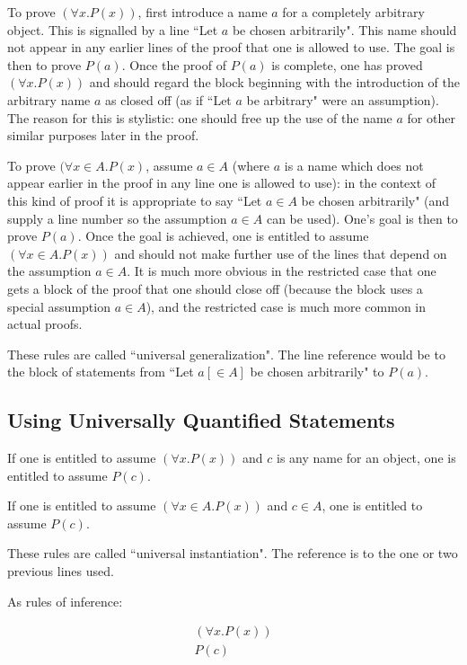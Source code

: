 \documentclass[12pt]{book}
\begin{document}
To prove $(\forall x.P(x))$,  first introduce a name $a$ for a completely arbitrary object.  This is signalled by a line ``Let $a$ be chosen arbitrarily".  This name should not appear
in any earlier lines of the proof that one is allowed to use.  The goal is then to prove $P(a)$. Once the proof of $P(a)$ is complete, one has proved $(\forall x.P(x))$ and should regard the block beginning with the introduction
of the arbitrary name $a$ as closed off (as if ``Let $a$ be arbitrary" were an assumption).  The reason for this is stylistic:  one should free up the use of the name $a$ for other similar purposes later in the proof.

To prove $(\forall x \in A.P(x)$, assume $a \in A$ (where $a$ is a name which does not appear earlier in the proof in any line one is allowed to use):  in the context of this kind of proof it is appropriate to say ``Let $a \in A$ be chosen arbitrarily" (and supply a line number so the assumption $a \in A$ can be used).  One's goal is then to prove $P(a)$.  Once the goal is achieved, one is entitled to assume
$(\forall x \in A.P(x))$ and should not make further use of the lines that depend on the assumption $a \in A$.  It is much more obvious in the restricted case that one gets a block of the proof that one should close off (because the block uses a special assumption $a \in A$), and the restricted case is much more common in actual proofs.

These rules are called ``universal generalization".  The line reference would be to the block of statements
from ``Let $a[\in A]$ be chosen arbitrarily" to $P(a)$.

\subsection{Using Universally Quantified Statements}

If one is entitled to assume $(\forall x.P(x))$ and $c$ is any name for an object, one is entitled to assume $P(c)$.

If one is entitled to assume $(\forall x \in A.P(x))$ and $c \in A$, one is entitled to assume $P(c)$.

These rules are called ``universal instantiation".  The reference is to the one or two previous lines used.

\newpage

As rules of inference:

$$\begin{array}{r} (\forall x.P(x)) \\ \hline P(c) \end{array}$$
\end{document}
